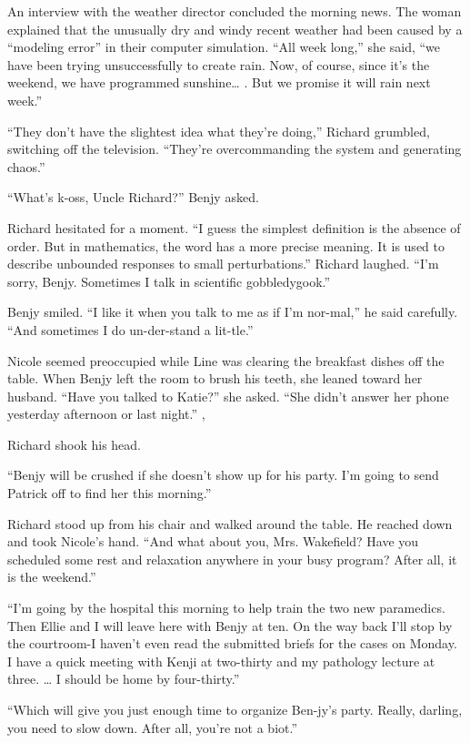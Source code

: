 \documentclass[]{article}
\begin{document}
{An interview with the weather director concluded the morning news. The woman explained that the unusually dry and windy recent weather had been caused by a “modeling error” in their computer simulation. “All week long,” she said, “we have been trying unsuccessfully to create rain. Now, of course, since it’s the weekend, we have programmed sunshine… . But we promise it will rain next week.”

“They don’t have the slightest idea what they’re doing,” Richard grumbled, switching off the television. “They’re overcommanding the system and generating chaos.”

“What’s k-oss, Uncle Richard?” Benjy asked.

Richard hesitated for a moment. “I guess the simplest definition is the absence of order. But in mathematics, the word has a more precise meaning. It is used to describe unbounded responses to small perturbations.” Richard laughed. “I’m sorry, Benjy. Sometimes I talk in scientific gobbledygook.”

Benjy smiled. “I like it when you talk to me as if I’m nor-mal,” he said carefully. “And sometimes I do un-der-stand a lit-tle.”

Nicole seemed preoccupied while Line was clearing the breakfast dishes off the table. When Benjy left the room to brush his teeth, she leaned toward her husband. “Have you talked to Katie?” she asked. “She didn’t answer her phone yesterday afternoon or last night.” ,

Richard shook his head.

“Benjy will be crushed if she doesn’t show up for his party. I’m going to send Patrick off to find her this morning.”

Richard stood up from his chair and walked around the table. He reached down and took Nicole’s hand. “And what about you, Mrs. Wakefield? Have you scheduled some rest and relaxation anywhere in your busy program? After all, it is the weekend.”

“I’m going by the hospital this morning to help train the two new paramedics. Then Ellie and I will leave here with Benjy at ten. On the way back I’ll stop by the courtroom-I haven’t even read the submitted briefs for the cases on Monday. I have a quick meeting with Kenji at two-thirty and my pathology lecture at three. … I should be home by four-thirty.”

“Which will give you just enough time to organize Ben-jy’s party. Really, darling, you need to slow down. After all, you’re not a biot.”

}
\end{document}
